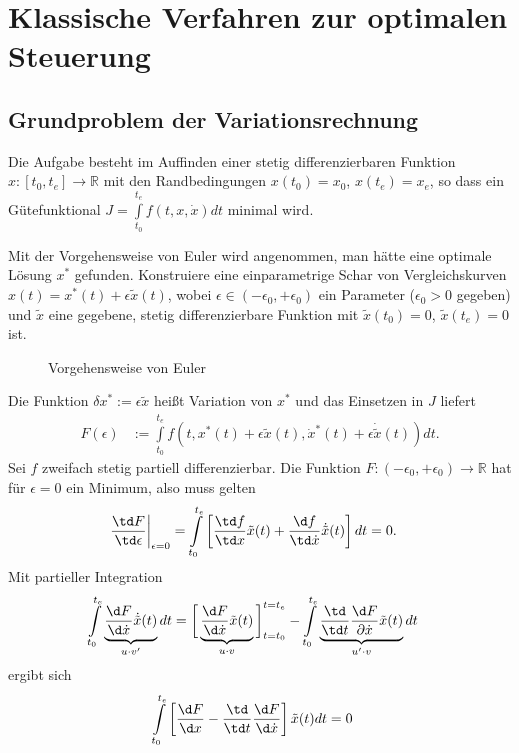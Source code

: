 \chapter{Klassische Verfahren zur optimalen Steuerung}
\section{Grundproblem der Variationsrechnung}
\label{sec:kap_2_grundproblem}
Die Aufgabe besteht im Auffinden einer stetig differenzierbaren Funktion $x:[t_0,t_e]\rightarrow\mathbb{R}$ mit den Randbedingungen $x(t_0)=x_0$, $x(t_e)=x_e$, so dass ein
Gütefunktional $J=\int\limits_{t_0}^{t_e}f(t,x,\dot{x}) dt$ minimal wird.

Mit der Vorgehensweise von Euler wird angenommen, man hätte eine optimale Lösung $x^{\ast}$ gefunden. Konstruiere eine einparametrige Schar von Vergleichskurven
$x(t)=x^{\ast}(t)+\epsilon\tilde{x}(t)$, wobei $\epsilon\in(-\epsilon_0,+\epsilon_0)$ ein Parameter ($\epsilon_0>0$ gegeben) und $\tilde{x}$ eine gegebene, stetig differenzierbare Funktion
mit $\tilde{x}(t_0)=0$, $\tilde{x}(t_e)=0$ ist.
\begin{figure}[htb]
	\centering
	
	\caption{Vorgehensweise von Euler}
	\label{fig:kap_2_vorg_euler}
\end{figure}
Die Funktion $\delta x^{\ast}:= \epsilon\tilde{x}$ heißt Variation von $x^{\ast}$ und das Einsetzen in $J$ liefert 
\begin{align*}
	F(\epsilon) & := \int\limits_{t_0}^{t_e}f(t,x^{\ast}(t)+\epsilon\tilde{x}(t),\dot{x}^{\ast}(t)+\epsilon\dot{\tilde{x}}(t))dt.
\end{align*}
Sei $f$ zweifach stetig partiell differenzierbar. Die Funktion $F:(-\epsilon_0,+\epsilon_0)\rightarrow\mathbb{R}$ hat für $\epsilon=0$ ein Minimum, also muss gelten
\begin{align*}
	\left.\frac{\td F}{\td \epsilon}\right|_{\epsilon=0} & = \int\limits_{t_0}^{t_e}\left[\frac{\td f}{\td x}\tilde{x}(t)+\frac{\d
	f}{\td\dot{x}}\dot{\tilde{x}}(t) \right]dt = 0.
\end{align*}
Mit partieller Integration 
\begin{align*}
	\int\limits_{t_0}^{t_e}\underbrace{\frac{\d F}{\d \dot{x}}\dot{\tilde{x}}(t)}_{u\cdot v'}dt & = \bigg[\underbrace{\frac{\d
	F}{\d\dot{x}}\tilde{x}(t)}_{u\cdot v}\bigg]_{t=t_0}^{t=t_e}-\int\limits_{t_0}^{t_e} \underbrace{\frac{\td}{\td t}\frac{\d
	F}{\partial\dot{x}}\tilde{x}(t)}_{u'\cdot v}dt
\end{align*}
ergibt sich
\begin{align*}
	\int\limits_{t_0}^{t_e}\left[\frac{\d F}{\d x}-\frac{\td}{\td t}\frac{\d F}{\d\dot{x}} \right]\tilde{x}(t)dt & = 0
\end{align*}
